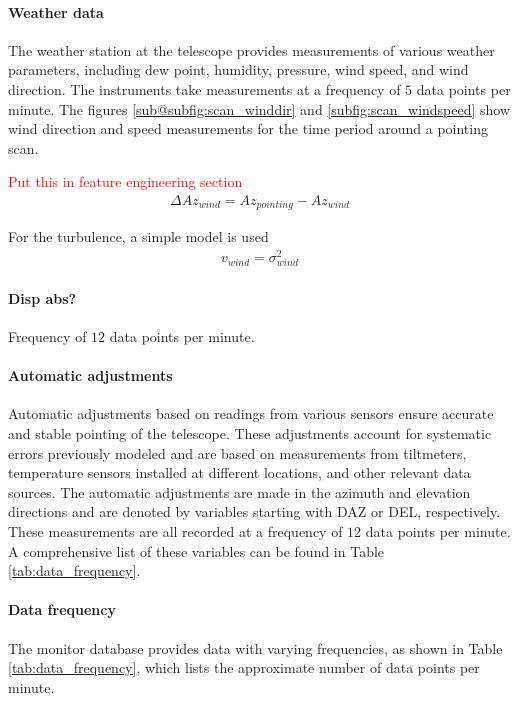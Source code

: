 \paragraph{Weather data}
The weather station at the telescope provides measurements of various weather parameters, including dew point, humidity, pressure, wind speed, and wind direction.
The instruments take measurements at a frequency of $5$ data points per minute.
The figures \ref{sub@subfig:scan_winddir} and \ref{subfig:scan_windspeed} show wind direction and speed measurements for the time period around a pointing scan.


\textcolor{red}{Put this in feature engineering section}
\begin{align}
    \Delta \textit{Az}_\textit{wind} = \textit{Az}_\textit{pointing} - \textit{Az}_\textit{wind}
\end{align}

For the turbulence, a simple model is used
\begin{align}
v_\textit{wind} = \sigma_\textit{wind}^2
\end{align}

\paragraph{Disp abs?}

Frequency of $12$ data points per minute.

\paragraph{Automatic adjustments}
Automatic adjustments based on readings from various sensors ensure accurate and stable pointing of the telescope.
These adjustments account for systematic errors previously modeled and are based on measurements from tiltmeters, temperature sensors installed at different locations, and other relevant data sources.
The automatic adjustments are made in the azimuth and elevation directions and are denoted by variables starting with DAZ or DEL, respectively.
These measurements are all recorded at a frequency of $12$ data points per minute.
A comprehensive list of these variables can be found in Table \ref{tab:data_frequency}.

\paragraph{Data frequency}
The monitor database provides data with varying frequencies, as shown in Table \ref{tab:data_frequency}, which lists the approximate number of data points per minute.

